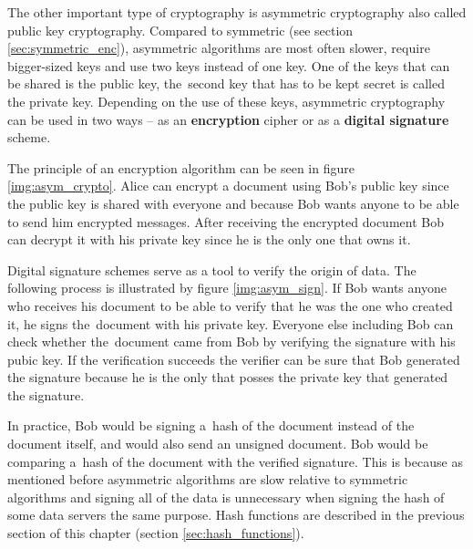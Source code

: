 The other important type of cryptography is asymmetric cryptography also called public key cryptography. Compared to symmetric (see section \ref{sec:symmetric_enc}), asymmetric algorithms are most often slower, require bigger-sized keys and use two keys instead of one key. One of the keys that can be shared is the public key, the~second key that has to be kept secret is called the private key. Depending on the use of these keys, asymmetric cryptography can be used in two ways -- as an \textbf{encryption} cipher or as a \textbf{digital signature} scheme.

The principle of an encryption algorithm can be seen in figure \ref{img:asym_crypto}. Alice can encrypt a document using Bob's public key since the public key is shared with everyone and because Bob wants anyone to be able to send him encrypted messages. After receiving the encrypted document Bob can decrypt it with his private key since he is the only one that owns it. \cite{Smart2004}


Digital signature schemes serve as a tool to verify the origin of data. The following process is illustrated by figure \ref{img:asym_sign}. If Bob wants anyone who receives his document to be able to verify that he was the one who created it, he signs the~document with his private key. Everyone else including Bob can check whether the~document came from Bob by verifying the signature with his pubic key. If the verification succeeds the verifier can be sure that Bob generated the signature because he is the only that posses the private key that generated the signature. \cite{Paar2010}

In practice, Bob would be signing a~hash of the document instead of the document itself, and would also send an unsigned document. Bob would be comparing a~hash of the document with the verified signature. This is because as mentioned before asymmetric algorithms are slow relative to symmetric algorithms and signing all of the data is unnecessary when signing the hash of some data servers the same purpose. Hash functions are described in the previous section of this chapter (section \ref{sec:hash_functions}).


